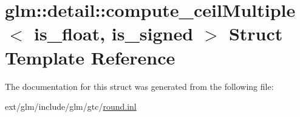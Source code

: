 \hypertarget{structglm_1_1detail_1_1compute__ceil_multiple}{\section{glm\-:\-:detail\-:\-:compute\-\_\-ceil\-Multiple$<$ is\-\_\-float, is\-\_\-signed $>$ Struct Template Reference}
\label{structglm_1_1detail_1_1compute__ceil_multiple}
}


The documentation for this struct was generated from the following file\-:\begin{DoxyCompactItemize}
\item 
ext/glm/include/glm/gtc/\hyperlink{round_8inl}{round.\-inl}\end{DoxyCompactItemize}
